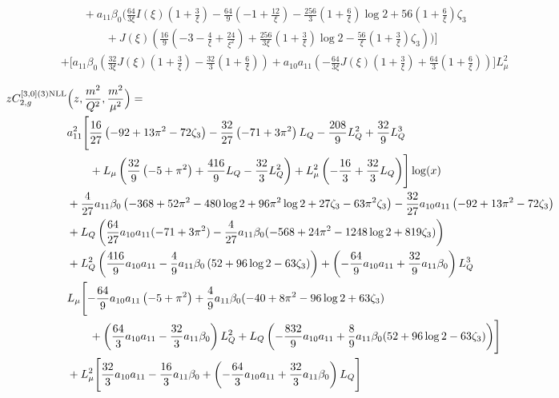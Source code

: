 \documentclass[a4paper]{article}
\begin{document}
\begin{equation}
\begin{split}
		&\qquad + a_{11} \beta_0 \Biggl(\frac{64}{3\xi} I(\xi) \left(1 + \frac{3}{\xi}\right) - \frac{64}{9} \left(-1 + \frac{12}{\xi}\right) - \frac{256}{3} \left(1 + \frac{6}{\xi}\right) \log 2 + 56 \left(1 + \frac{6}{\xi}\right) \zeta_3 \\
		& \qquad \qquad + J(\xi) \left( \frac{16}{9} \left(-3 - \frac{4}{\xi} + \frac{24}{\xi^2}\right) + \frac{256}{3\xi} \left(1 + \frac{3}{\xi}\right) \log 2 - \frac{56}{\xi}\left(1 + \frac{3}{\xi}\right) \zeta_3 \right)\Biggr)\Biggr] \\
		& + \Biggl[a_{11} \beta_0 \left( \frac{32}{3\xi} J(\xi) \left(1 + \frac{3}{\xi}\right) - \frac{32}{3} \left(1 + \frac{6}{\xi}\right) \right)  + a_{10} a_{11} \left(-\frac{64}{3\xi} J(\xi) \left(1 + \frac{3}{\xi}\right) + \frac{64}{3} \left(1 + \frac{6}{\xi}\right)\right)\Biggr] L_\mu^2
	\end{split}
\end{equation}

\begin{equation}
	\begin{split}
		z C_{2,g}^{[3, 0](3) \rm NLL}&\Bigl(z,\frac{m^2}{Q^2},\frac{m^2}{\mu^2}\Bigr)= \\
		& a_{11}^2 \Biggl[\frac{16}{27} \left(-92 + 13 \pi^2 - 72 \zeta_3\right) -\frac{32}{27} \left(-71 + 3 \pi^2\right) L_Q - \frac{208}{9} L_Q^2 + \frac{32}{9} L_Q^3  \\
		& \qquad + L_\mu \left(\frac{32}{9} \left(-5 + \pi^2\right) + \frac{416}{9} L_Q - \frac{32}{3} L_Q^2 \right) + L_\mu^2 \left(-\frac{16}{3} + \frac{32}{3} L_Q\right)\Biggr] \log(x) \\
		& + \frac{4}{27} a_{11} \beta_0 \left(-368 + 52 \pi^2 - 480 \log 2 + 96 \pi^2 \log 2 + 27 \zeta_3 - 63 \pi^2 \zeta_3\right) - \frac{32}{27} a_{10} a_{11} \left(-92 + 13 \pi^2 - 72 \zeta_3\right) \\
		& + L_Q \left( \frac{64}{27} a_{10} a_{11} (-71 + 3 \pi^2) - \frac{4}{27} a_{11} \beta_0 (-568 + 24 \pi^2 - 1248 \log 2 + 819 \zeta_3) \right) \\
		& + L_Q^2 \left(\frac{416}{9} a_{10} a_{11} - \frac{4}{9} a_{11} \beta_0 \left(52 + 96 \log 2 - 63 \zeta_3 \right)\right) + \left(- \frac{64}{9} a_{10} a_{11} + \frac{32}{9} a_{11} \beta_0 \right) L_Q^3 \\
		& L_\mu \Biggl[-\frac{64}{9} a_{10} a_{11} \left(-5 + \pi^2\right) + \frac{4}{9} a_{11} \beta_0 (-40 + 8 \pi^2 - 96 \log 2 + 63 \zeta_3) \\
		& \qquad + \left(\frac{64}{3} a_{10} a_{11} - \frac{32}{3} a_{11} \beta_0 \right) L_Q^2 + L_Q \left(-\frac{832}{9} a_{10} a_{11} + \frac{8}{9} a_{11} \beta_0 (52 + 96 \log 2 - 63 \zeta_3)\right) \Biggr] \\
		& + L_\mu^2 \Biggl[\frac{32}{3} a_{10} a_{11} - \frac{16}{3} a_{11} \beta_0 + \left(-\frac{64}{3} a_{10} a_{11} + \frac{32}{3} a_{11} \beta_0 \right) L_Q \Biggr]
	\end{split}
\end{equation}
\end{document}
